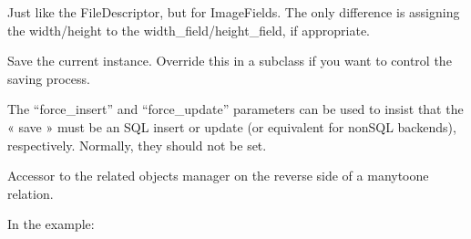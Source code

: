 \documentclass[letterpaper,10pt,french]{sphinxmanual}
\begin{document}
\begin{fulllineitems}

\begin{fulllineitems}
\label{\detokenize{main/model:main.models.Etudiant.profil}}
\pysigstartsignatures
{}
\pysigstopsignatures
\sphinxAtStartPar
Just like the FileDescriptor, but for ImageFields. The only difference is
assigning the width/height to the width\_field/height\_field, if appropriate.

\end{fulllineitems}


\begin{fulllineitems}
\label{\detokenize{main/model:main.models.Etudiant.save}}
\pysigstartsignatures
{}
\pysigstopsignatures
\sphinxAtStartPar
Save the current instance. Override this in a subclass if you want to
control the saving process.

\sphinxAtStartPar
The “force\_insert” and “force\_update” parameters can be used to insist
that the « save » must be an SQL insert or update (or equivalent for
non\sphinxhyphen{}SQL backends), respectively. Normally, they should not be set.

\end{fulllineitems}


\begin{fulllineitems}
\label{\detokenize{main/model:main.models.Etudiant.seance_auteur}}
\pysigstartsignatures
{}
\pysigstopsignatures
\sphinxAtStartPar
Accessor to the related objects manager on the reverse side of a
many\sphinxhyphen{}to\sphinxhyphen{}one relation.

\sphinxAtStartPar
In the example:

\begin{sphinxVerbatim}[commandchars=\\\{\}]
 
       
\end{sphinxVerbatim}


\end{fulllineitems}
\end{fulllineitems}
\end{document}

